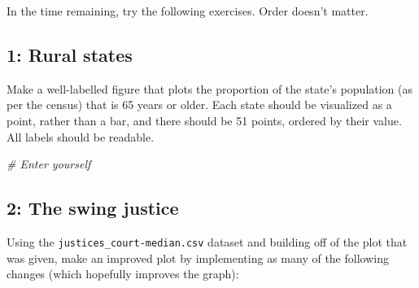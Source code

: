 \documentclass[
]{book}
\newenvironment{Shaded}{\begin{snugshade}}{\end{snugshade}}
\newcommand{\CommentTok}[1]{\textcolor[rgb]{0.56,0.35,0.01}{\textit{#1}}}
\theoremstyle{definition}
\theoremstyle{definition}
\theoremstyle{definition}
\theoremstyle{remark}
\begin{document}
In the time remaining, try the following exercises. Order doesn't matter.

\hypertarget{rural-states}{%
\subsection*{1: Rural states}\label{rural-states}}

Make a well-labelled figure that plots the proportion of the state's population (as per the census) that is 65 years or older. Each state should be visualized as a point, rather than a bar, and there should be 51 points, ordered by their value. All labels should be readable.

\begin{Shaded}
\begin{Highlighting}[]
\CommentTok{\# Enter yourself}
\end{Highlighting}
\end{Shaded}

\hypertarget{the-swing-justice}{%
\subsection*{2: The swing justice}\label{the-swing-justice}}

Using the \texttt{justices\_court-median.csv} dataset and building off of the plot that was given, make an improved plot by implementing as many of the following changes (which hopefully improves the graph):
\end{document}
